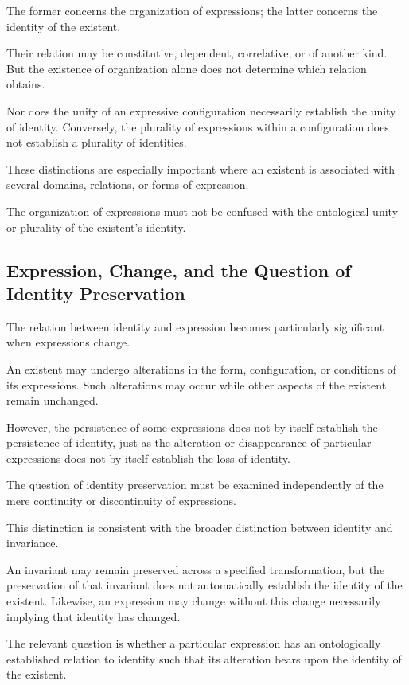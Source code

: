 The former concerns the organization of expressions;
the latter concerns the identity of the existent.

Their relation may be constitutive, dependent,
correlative, or of another kind. But the existence
of organization alone does not determine which
relation obtains.

Nor does the unity of an expressive configuration
necessarily establish the unity of identity.
Conversely, the plurality of expressions within
a configuration does not establish a plurality
of identities.

These distinctions are especially important where
an existent is associated with several domains,
relations, or forms of expression.

The organization of expressions must not be confused
with the ontological unity or plurality of the
existent's identity.

\subsection{Expression, Change, and the Question of Identity Preservation}

The relation between identity and expression becomes
particularly significant when expressions change.

An existent may undergo alterations in the form,
configuration, or conditions of its expressions.
Such alterations may occur while other aspects
of the existent remain unchanged.

However, the persistence of some expressions does
not by itself establish the persistence of identity,
just as the alteration or disappearance of particular
expressions does not by itself establish the loss
of identity.

The question of identity preservation must be
examined independently of the mere continuity
or discontinuity of expressions.

This distinction is consistent with the broader
distinction between identity and invariance.

An invariant may remain preserved across a specified
transformation, but the preservation of that invariant
does not automatically establish the identity of
the existent. Likewise, an expression may change
without this change necessarily implying that
identity has changed.

The relevant question is whether a particular
expression has an ontologically established relation
to identity such that its alteration bears upon
the identity of the existent.

